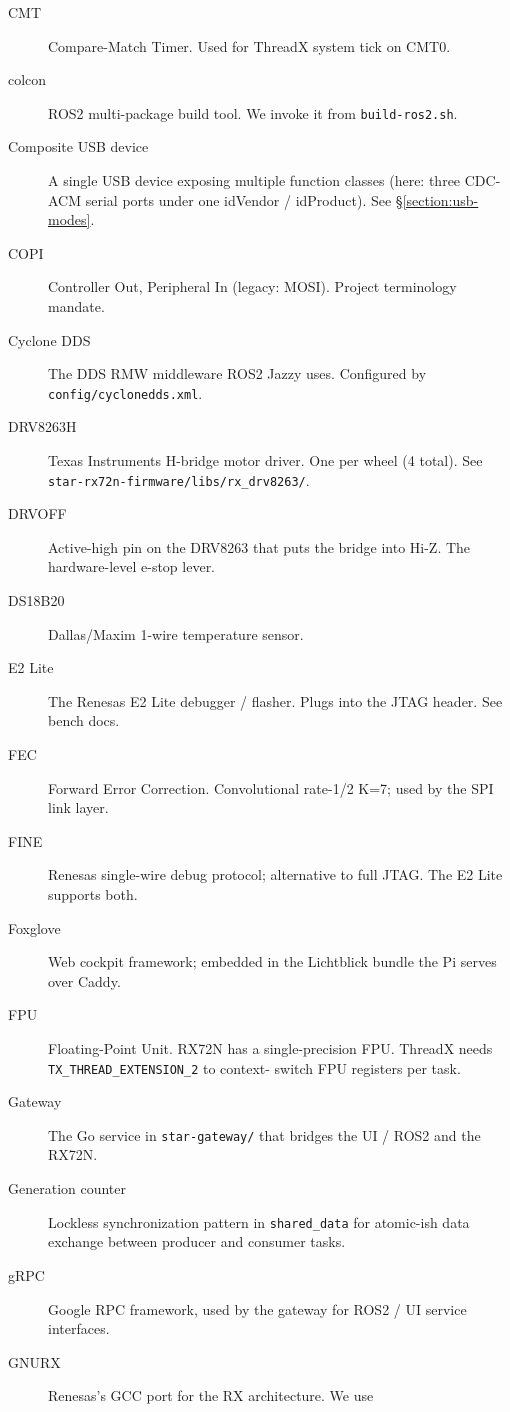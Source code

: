 \begin{description}
  \item[CMT] Compare-Match Timer. Used for ThreadX system tick on
        CMT0.
  \item[colcon] ROS2 multi-package build tool. We invoke it from
        \texttt{build-ros2.sh}.
  \item[Composite USB device] A single USB device exposing multiple
        function classes (here: three CDC-ACM serial ports under one
        idVendor / idProduct). See \S\ref{section:usb-modes}.
  \item[COPI] Controller Out, Peripheral In (legacy: MOSI). Project
        terminology mandate.
  \item[Cyclone DDS] The DDS RMW middleware ROS2 Jazzy uses.
        Configured by \texttt{config/cyclonedds.xml}.
  \item[DRV8263H] Texas Instruments H-bridge motor driver. One per
        wheel (4 total). See \texttt{star-rx72n-firmware/libs/rx\_drv8263/}.
  \item[DRVOFF] Active-high pin on the DRV8263 that puts the bridge
        into Hi-Z. The hardware-level e-stop lever.
  \item[DS18B20] Dallas/Maxim 1-wire temperature sensor.
  \item[E2 Lite] The Renesas E2 Lite debugger / flasher. Plugs into
        the JTAG header. See bench docs.
  \item[FEC] Forward Error Correction. Convolutional rate-1/2 K=7;
        used by the SPI link layer.
  \item[FINE] Renesas single-wire debug protocol; alternative to
        full JTAG. The E2 Lite supports both.
  \item[Foxglove] Web cockpit framework; embedded in the Lichtblick
        bundle the Pi serves over Caddy.
  \item[FPU] Floating-Point Unit. RX72N has a single-precision FPU.
        ThreadX needs \texttt{TX\_THREAD\_EXTENSION\_2} to context-
        switch FPU registers per task.
  \item[Gateway] The Go service in \texttt{star-gateway/} that
        bridges the UI / ROS2 and the RX72N.
  \item[Generation counter] Lockless synchronization pattern in
        \texttt{shared\_data} for atomic-ish data exchange between
        producer and consumer tasks.
  \item[gRPC] Google RPC framework, used by the gateway for ROS2 /
        UI service interfaces.
  \item[GNURX] Renesas's GCC port for the RX architecture. We use

\end{description}
